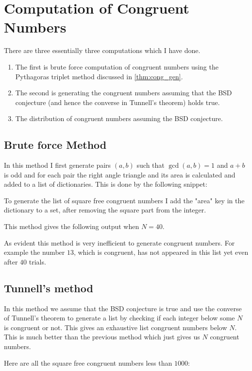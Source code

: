 \section{Computation of Congruent Numbers}
There are three essentially three computations which I have done.
\begin{enumerate}
  \item The first is brute force computation of congruent numbers using the Pythagoras triplet method discussed in \cref{thm:cong_gen}.
  \item The second is generating the congruent numbers assuming that the BSD conjecture (and hence the converse in Tunnell's theorem) holds true.
  \item The distribution of congruent numbers assuming the BSD conjecture.
\end{enumerate}
\subsection{Brute force Method}
In this method I first generate pairs $(a,b)$ such that $\gcd(a,b) = 1$ and $a+b$ is odd and for each pair the right angle triangle and its area is calculated and added to a list of dictionaries. This is done by the following snippet:

To generate the list of square free congruent numbers I add the "area" key in the dictionary to a set, after removing the square part from the integer. 

This method gives the following output when $N = 40$.

As evident this method is very inefficient to generate congruent numbers. For example the number $13$, which is congruent, has not appeared in this list yet even after $40$ trials.

\subsection{Tunnell's method}
In this method we assume that the BSD conjecture is true and use the converse of Tunnell's theorem to generate a list by checking if each integer below some $N$ is congruent or not. This gives an exhaustive list congruent numbers below $N$. This is much better than the previous method which just gives us $N$ congruent numbers.

Here are all the square free congruent numbers less than $1000$:


